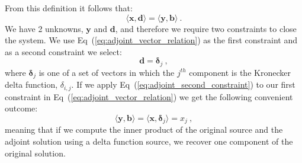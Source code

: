 \documentclass[preprint,11pt]{elsarticle}
\newcommand{\ve}[1]{\ensuremath{\mathbf{#1}}}
\begin{document}
From this definition it follows that:
\begin{equation}
  \langle \ve{x}, \ve{d} \rangle = \langle \ve{y}, \ve{b} \rangle\:.
  \label{eq:adjoint_vector_relation}
\end{equation}
We have 2 unknowns, $\ve{y}$ and $\ve{d}$, and therefore we require two
constraints to close the system. We use Eq~(\ref{eq:adjoint_vector_relation})
as the first constraint and as a second constraint we select:
\begin{equation}
  \ve{d} = \boldsymbol{\delta}_j\:,
  \label{eq:adjoint_second_constraint}
\end{equation}
where $\boldsymbol{\delta}_j$ is one of a set of vectors in which the $j^{th}$
component is the Kronecker delta function, $\delta_{i,j}$. If we apply
Eq~(\ref{eq:adjoint_second_constraint}) to our first constraint in
Eq~(\ref{eq:adjoint_vector_relation}) we get the following convenient
outcome:
\begin{equation}
  \langle \ve{y}, \ve{b} \rangle = \langle \ve{x},
  \boldsymbol{\delta}_j \rangle = x_j \:,
  \label{eq:inner_product_constraint}
\end{equation}
meaning that if we compute the inner product of the original source and the
adjoint solution using a delta function source, we recover one component of
the original solution.
\end{document}

